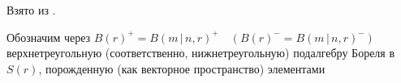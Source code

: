 Взято из \cite{borel_subalgebras}.

Обозначим через $ B(r)^+ = B(m\,|\,n, r)^+ \quad (B(r)^- = B(m\,|\,n, r)^-) $ верхнетреугольную (соответственно, нижнетреугольную) 
подалгебру Бореля в $S(r)$, порожденную (как векторное пространство) элементами 
